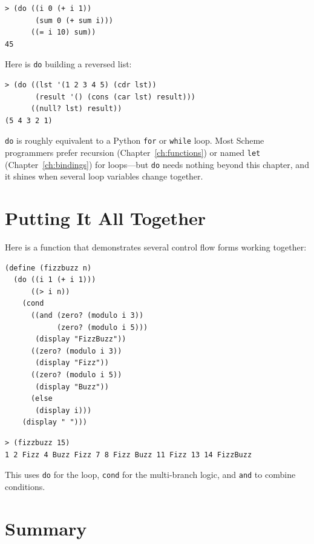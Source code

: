 \begin{lstlisting}[style=repl]
> (do ((i 0 (+ i 1))
       (sum 0 (+ sum i)))
      ((= i 10) sum))
45
\end{lstlisting}

Here is \texttt{do} building a reversed list:

\begin{lstlisting}[style=repl]
> (do ((lst '(1 2 3 4 5) (cdr lst))
       (result '() (cons (car lst) result)))
      ((null? lst) result))
(5 4 3 2 1)
\end{lstlisting}

\begin{note}
\texttt{do} is roughly equivalent to a Python \texttt{for} or \texttt{while} loop. Most Scheme programmers prefer recursion (Chapter~\ref{ch:functions}) or named \texttt{let} (Chapter~\ref{ch:bindings}) for loops---but \texttt{do} needs nothing beyond this chapter, and it shines when several loop variables change together.
\end{note}

\section{Putting It All Together}

Here is a function that demonstrates several control flow forms working together:

\begin{lstlisting}
(define (fizzbuzz n)
  (do ((i 1 (+ i 1)))
      ((> i n))
    (cond
      ((and (zero? (modulo i 3))
            (zero? (modulo i 5)))
       (display "FizzBuzz"))
      ((zero? (modulo i 3))
       (display "Fizz"))
      ((zero? (modulo i 5))
       (display "Buzz"))
      (else
       (display i)))
    (display " ")))
\end{lstlisting}

\begin{lstlisting}[style=repl]
> (fizzbuzz 15)
1 2 Fizz 4 Buzz Fizz 7 8 Fizz Buzz 11 Fizz 13 14 FizzBuzz
\end{lstlisting}

This uses \texttt{do} for the loop, \texttt{cond} for the multi-branch logic, and \texttt{and} to combine conditions.

\section*{Summary}

